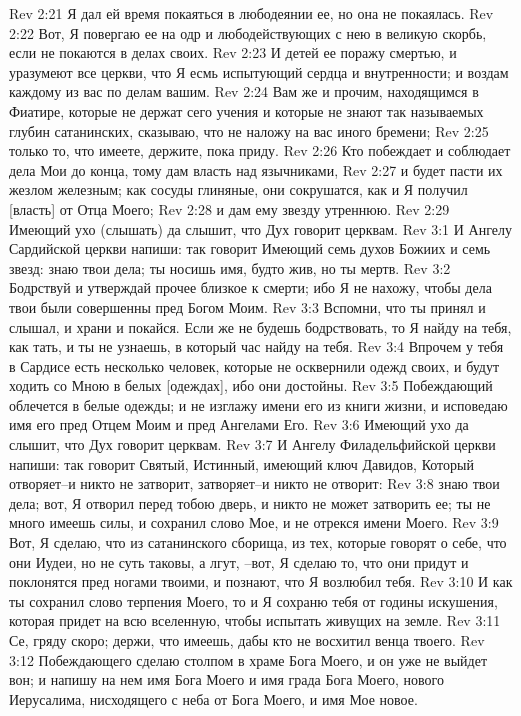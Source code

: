 Rev 2:21  Я дал ей время покаяться в любодеянии ее, но она не покаялась.
Rev 2:22  Вот, Я повергаю ее на одр и любодействующих с нею в великую скорбь, если не покаются в делах своих.
Rev 2:23  И детей ее поражу смертью, и уразумеют все церкви, что Я есмь испытующий сердца и внутренности; и воздам каждому из вас по делам вашим.
Rev 2:24  Вам же и прочим, находящимся в Фиатире, которые не держат сего учения и которые не знают так называемых глубин сатанинских, сказываю, что не наложу на вас иного бремени;
Rev 2:25  только то, что имеете, держите, пока приду.
Rev 2:26  Кто побеждает и соблюдает дела Мои до конца, тому дам власть над язычниками,
Rev 2:27  и будет пасти их жезлом железным; как сосуды глиняные, они сокрушатся, как и Я получил [власть] от Отца Моего;
Rev 2:28  и дам ему звезду утреннюю.
Rev 2:29  Имеющий ухо (слышать) да слышит, что Дух говорит церквам.
Rev 3:1  И Ангелу Сардийской церкви напиши: так говорит Имеющий семь духов Божиих и семь звезд: знаю твои дела; ты носишь имя, будто жив, но ты мертв.
Rev 3:2  Бодрствуй и утверждай прочее близкое к смерти; ибо Я не нахожу, чтобы дела твои были совершенны пред Богом Моим.
Rev 3:3  Вспомни, что ты принял и слышал, и храни и покайся. Если же не будешь бодрствовать, то Я найду на тебя, как тать, и ты не узнаешь, в который час найду на тебя.
Rev 3:4  Впрочем у тебя в Сардисе есть несколько человек, которые не осквернили одежд своих, и будут ходить со Мною в белых [одеждах], ибо они достойны.
Rev 3:5  Побеждающий облечется в белые одежды; и не изглажу имени его из книги жизни, и исповедаю имя его пред Отцем Моим и пред Ангелами Его.
Rev 3:6  Имеющий ухо да слышит, что Дух говорит церквам.
Rev 3:7  И Ангелу Филадельфийской церкви напиши: так говорит Святый, Истинный, имеющий ключ Давидов, Который отворяет--и никто не затворит, затворяет--и никто не отворит:
Rev 3:8  знаю твои дела; вот, Я отворил перед тобою дверь, и никто не может затворить ее; ты не много имеешь силы, и сохранил слово Мое, и не отрекся имени Моего.
Rev 3:9  Вот, Я сделаю, что из сатанинского сборища, из тех, которые говорят о себе, что они Иудеи, но не суть таковы, а лгут, --вот, Я сделаю то, что они придут и поклонятся пред ногами твоими, и познают, что Я возлюбил тебя.
Rev 3:10  И как ты сохранил слово терпения Моего, то и Я сохраню тебя от годины искушения, которая придет на всю вселенную, чтобы испытать живущих на земле.
Rev 3:11  Се, гряду скоро; держи, что имеешь, дабы кто не восхитил венца твоего.
Rev 3:12  Побеждающего сделаю столпом в храме Бога Моего, и он уже не выйдет вон; и напишу на нем имя Бога Моего и имя града Бога Моего, нового Иерусалима, нисходящего с неба от Бога Моего, и имя Мое новое.
